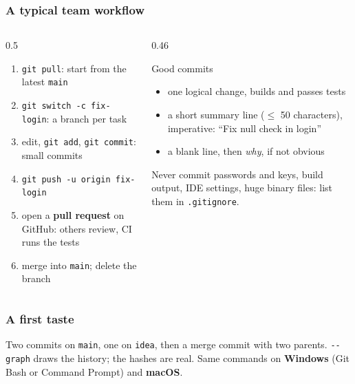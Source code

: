 \documentclass[aspectratio=169,10pt,compress]{beamer}
\newcommand{\win}{\textbf{Windows}}
\newcommand{\mac}{\textbf{macOS}}
\begin{document}




\begin{frame}[t,fragile] \frametitle{A typical team workflow}
  \begin{columns}[T]
    \begin{column}{0.5\textwidth}
      \begin{enumerate}\small
        \item \texttt{git pull}: start from the latest \texttt{main}
        \item \texttt{git switch -c fix-login}: a branch per task
        \item edit, \texttt{git add}, \texttt{git commit}: small commits
        \item \texttt{git push -u origin fix-login}
        \item open a \textbf{pull request} on GitHub: others review, CI runs the tests
        \item merge into \texttt{main}; delete the branch
      \end{enumerate}
    \end{column}
    \begin{column}{0.46\textwidth}
      \begin{block}{Good commits}
        \small
        \begin{itemize}
          \item one logical change, builds and passes tests
          \item a short summary line ($\le$ 50 characters), imperative: ``Fix null check in login''
          \item a blank line, then \emph{why}, if not obvious
        \end{itemize}
      \end{block}
      \begin{block}{Never commit}
        \small passwords and keys, build output, IDE settings, huge binary files: list them in \texttt{.gitignore}.
      \end{block}
    \end{column}
  \end{columns}
\end{frame}




\begin{frame}[t,fragile] \frametitle{A first taste}

  \vspace{0.1em}
  \small
  Two commits on \texttt{main}, one on \texttt{idea}, then a merge commit with two parents. \texttt{-{}-graph} draws the history; the
  hashes are real. Same commands on \win{} (Git Bash or Command Prompt) and \mac.
\end{frame}
\end{document}
